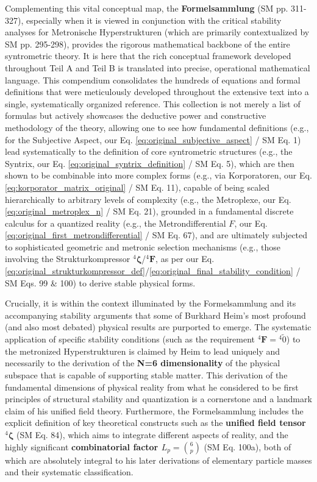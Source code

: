 \documentclass[
    12pt,              %
    a4paper,           %
    headings=normal,   %
    twoside=true,      %
    BCOR=8mm,          %
]{scrbook}
\newcommand{\metrondifferential}{F}
\newcommand{\strukturkompressor}{{}^4\bm{\zeta}}
\newcommand{\metronisiertekondensor}[1]{{}^{#1}\mathbf{F}}
\begin{document}
Complementing this vital conceptual map, the \textbf{Formelsammlung} (SM pp. 311-327), especially when it is viewed in conjunction with the critical stability analyses for Metronische Hyperstrukturen (which are primarily contextualized by SM pp. 295-298), provides the rigorous mathematical backbone of the entire syntrometric theory. It is here that the rich conceptual framework developed throughout Teil A and Teil B is translated into precise, operational mathematical language. This compendium consolidates the hundreds of equations and formal definitions that were meticulously developed throughout the extensive text into a single, systematically organized reference. This collection is not merely a list of formulas but actively showcases the deductive power and constructive methodology of the theory, allowing one to see how fundamental definitions (e.g., for the Subjective Aspect, our Eq. \eqref{eq:original_subjective_aspect} / SM Eq. 1) lead systematically to the definition of core syntrometric structures (e.g., the Syntrix, our Eq. \eqref{eq:original_syntrix_definition} / SM Eq. 5), which are then shown to be combinable into more complex forms (e.g., via Korporatoren, our Eq. \eqref{eq:korporator_matrix_original} / SM Eq. 11), capable of being scaled hierarchically to arbitrary levels of complexity (e.g., the Metroplexe, our Eq. \eqref{eq:original_metroplex_n} / SM Eq. 21), grounded in a fundamental discrete calculus for a quantized reality (e.g., the Metrondifferential \( \metrondifferential \), our Eq. \eqref{eq:original_first_metrondifferential} / SM Eq. 67), and are ultimately subjected to sophisticated geometric and metronic selection mechanisms (e.g., those involving the Strukturkompressor \( \strukturkompressor \)/\( \metronisiertekondensor{4} \), as per our Eq. \eqref{eq:original_strukturkompressor_def}/\eqref{eq:original_final_stability_condition} / SM Eqs. 99 \& 100) to derive stable physical forms.

Crucially, it is within the context illuminated by the Formelsammlung and its accompanying stability arguments that some of Burkhard Heim's most profound (and also most debated) physical results are purported to emerge. The systematic application of specific stability conditions (such as the requirement \( \metronisiertekondensor{4} = {}^{4}\tilde{0} \)) to the metronized Hyperstrukturen is claimed by Heim to lead uniquely and necessarily to the derivation of the \textbf{N=6 dimensionality} of the physical subspace that is capable of supporting stable matter. This derivation of the fundamental dimensions of physical reality from what he considered to be first principles of structural stability and quantization is a cornerstone and a landmark claim of his unified field theory. Furthermore, the Formelsammlung includes the explicit definition of key theoretical constructs such as the \textbf{unified field tensor \( \strukturkompressor \)} (SM Eq. 84), which aims to integrate different aspects of reality, and the highly significant \textbf{combinatorial factor \( L_p = \binom{6}{p} \)} (SM Eq. 100a), both of which are absolutely integral to his later derivations of elementary particle masses and their systematic classification.
\end{document}
